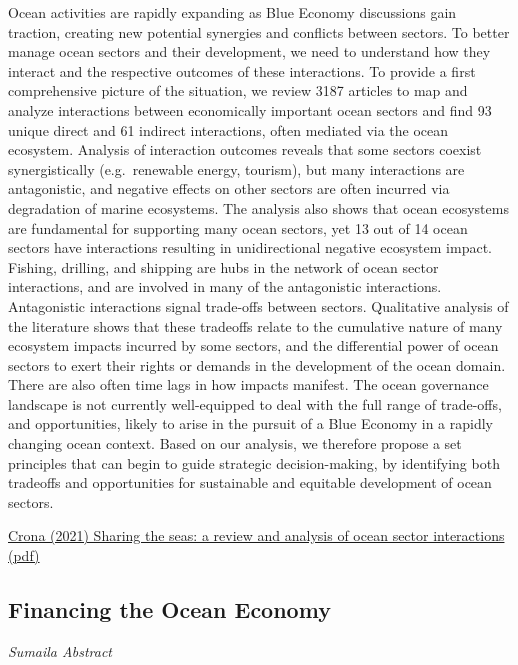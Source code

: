 \documentclass[
]{book}
\begin{document}
Ocean activities are rapidly expanding as Blue Economy discussions gain traction, creating new potential synergies and conflicts between sectors. To better manage ocean sectors and their development, we need to understand how they interact and the respective outcomes of these interactions. To provide a first comprehensive picture of the situation, we review 3187 articles to map and analyze interactions between economically important ocean sectors and find 93 unique direct and 61 indirect interactions, often mediated via the ocean ecosystem. Analysis of interaction outcomes reveals that some sectors coexist synergistically (e.g.~renewable energy, tourism), but many interactions are antagonistic, and negative effects on other sectors are often incurred via degradation of marine ecosystems. The analysis also shows that ocean ecosystems are fundamental for supporting many ocean sectors, yet 13 out of 14 ocean sectors have interactions resulting in unidirectional negative ecosystem impact. Fishing, drilling, and shipping are hubs in the network of ocean sector interactions, and are involved in many of the antagonistic interactions. Antagonistic interactions signal trade-offs between sectors. Qualitative analysis of the literature shows that these tradeoffs relate to the cumulative nature of many ecosystem impacts incurred by some sectors, and the differential power of ocean sectors to exert their rights or demands in the development of the ocean domain. There are also often time lags in how impacts manifest. The ocean governance landscape is not currently well-equipped to deal with the full range of trade-offs, and opportunities, likely to arise in the pursuit of a Blue Economy in a rapidly changing ocean context. Based on our analysis, we therefore propose a set principles that can begin to guide strategic decision-making, by identifying both tradeoffs and opportunities for sustainable and equitable development of ocean sectors.

\href{https://iopscience.iop.org/article/10.1088/1748-9326/ac02ed/meta}{Crona (2021) Sharing the seas: a review and analysis of ocean sector interactions}
\href{pdf/Crona_2021_Ocean_Economy.pdf}{(pdf)}

\hypertarget{financing-the-ocean-economy}{%
\subsection{Financing the Ocean Economy}\label{financing-the-ocean-economy}}

\emph{Sumaila Abstract}
\end{document}
